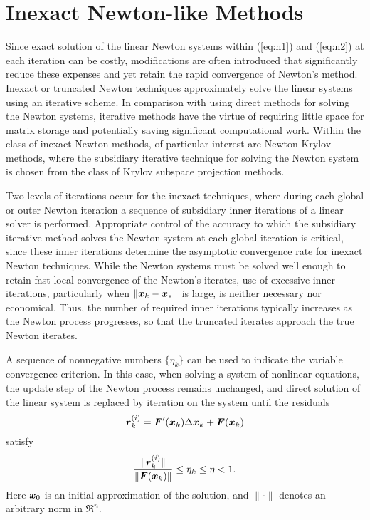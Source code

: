 \section{Inexact Newton-like Methods}

Since exact solution of the linear Newton systems within (\ref{eq:n1}) 
and (\ref{eq:n2}) at each iteration can be costly, modifications 
are often introduced that significantly reduce these expenses and 
yet retain the rapid convergence of Newton's method.  Inexact or 
truncated Newton techniques approximately solve the linear systems 
using an iterative scheme.  In comparison with using direct methods 
for solving the Newton systems, iterative methods have the virtue 
of requiring little space for matrix storage and potentially saving 
significant computational work.  Within the class of inexact Newton 
methods, of particular interest are Newton-Krylov methods, where the 
subsidiary iterative technique for solving the Newton system is 
chosen from the class of Krylov subspace projection methods.

Two levels of iterations occur for the inexact techniques, where 
during each global or outer Newton iteration a sequence of 
subsidiary inner iterations of a linear solver is performed.
Appropriate control of the accuracy to which the subsidiary 
iterative method solves the Newton system
at each global iteration is critical, since these 
inner iterations determine the asymptotic convergence rate for 
inexact Newton techniques.
While the Newton systems must be solved well enough to retain
fast local convergence of the Newton's iterates, use of excessive
inner iterations, particularly when $\| \mbox{\boldmath \(x\)}_k - \mbox{\boldmath \(x\)}_* \|$ is large,
is neither necessary nor economical.
Thus, the number of required inner iterations typically increases
as the Newton process progresses, so that the truncated iterates
approach the true Newton iterates.

A sequence of nonnegative numbers $\{\eta_k\}$ can be used to 
indicate the variable convergence criterion.
In this case, when solving a system of nonlinear equations, the 
update step of the Newton process remains unchanged, and direct 
solution of the linear system is replaced by iteration on the 
system until the residuals
\[  \mbox{\boldmath \(r\)}_k^{(i)} =  \mbox{\boldmath \(F\)}'(\mbox{\boldmath \(x\)}_k) \Delta \mbox{\boldmath \(x\)}_k + \mbox{\boldmath \(F\)}(\mbox{\boldmath \(x\)}_k) \]
satisfy
\[  \frac{ \| \mbox{\boldmath \(r\)}_k^{(i)} \| }{ \| \mbox{\boldmath \(F\)}(\mbox{\boldmath \(x\)}_k) \| } \leq \eta_k \leq \eta < 1. \]
Here $\mbox{\boldmath \(x\)}_0$ is an initial approximation of the solution, and
$\| \cdot \|$ denotes an arbitrary norm in $\Re^n$.  

